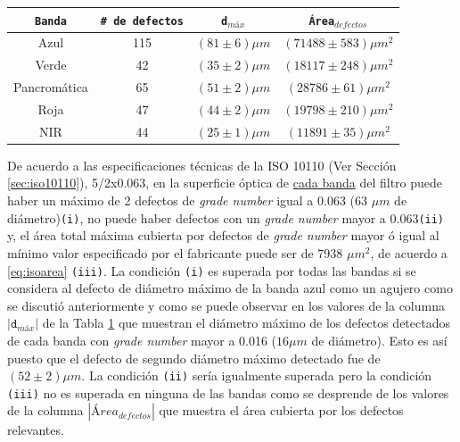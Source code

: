 \begin{table}
\begin{center}
\begin{tabular}{ |c|c|c|c| }    \toprule
\texttt{Banda} & \texttt{\# de defectos} & \texttt{d$_{máx}$} & \texttt{Área$_{defectos}$}\\\midrule
\rowcolor{blue!15} Azul    & 115 & $(81 \pm 6)\mu m$ & $(71488 \pm 583)\mu m^{2}$   \\ 
\rowcolor{green!50} Verde  & 42 &  $(35 \pm 2)\mu m$ &  $(18117 \pm 248) \mu m^{2}$\\ 
Pancromática& 65 & $(51 \pm 2)\mu m$ & $(28786 \pm 61)\mu m^{2}$  \\
\rowcolor{red!50} Roja & 47 &  $(44 \pm 2)\mu m$ &   $(19798 \pm 210 )\mu m^{2}$ \\
\rowcolor{maroon!20} NIR & 44 & $(25 \pm 1) \mu m$  & $(11891 \pm 35 )\mu m^{2}$ \\
\bottomrule
 \hline
\end{tabular}
\end{center}
 \label{tabISO}
\end{table}

De acuerdo a las especificaciones técnicas de la ISO 10110 (Ver Sección \ref{sec:iso10110}), 5/2x0.063,  en la superficie óptica de \underline{cada banda} del filtro puede haber un máximo de 2 defectos de \textit{grade number} igual a 0.063 (63 $\mu m$ de diámetro)\texttt{(i)}, no puede haber defectos con un \textit{grade number} mayor a 0.063\texttt{(ii)} y, el área total máxima cubierta por defectos de \textit{grade number} mayor ó igual al mínimo valor especificado por el fabricante puede ser de 7938 $\mu m^{2}$, de acuerdo a \ref{eq:isoarea} \texttt{(iii)}. La condición \texttt{(i)} es superada por todas las bandas si se considera al defecto de diámetro máximo de la banda azul como un agujero como se discutió anteriormente y como se puede observar en los valores de la columna $|\texttt{d$_{máx}$}|$ de la Tabla \ref{tabISO} que muestran el diámetro máximo de los defectos detectados de cada banda con \textit{grade number} mayor a 0.016 ($16 \mu m$ de diámetro). Esto es así puesto que el defecto de segundo diámetro máximo detectado fue de $(52 \pm 2) \mu m$. La condición \texttt{(ii)} sería igualmente superada pero la condición \texttt{(iii)} no es superada en ninguna de las bandas como se desprende de los valores de la columna $| Área_{defectos}|$  que muestra el área cubierta por los defectos relevantes.

